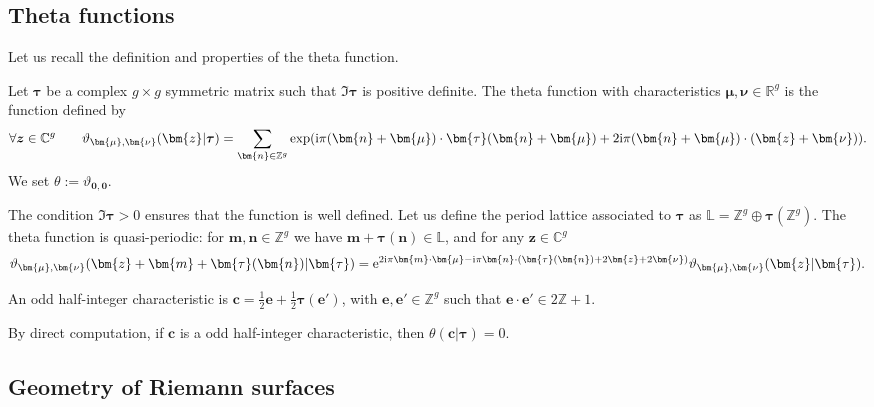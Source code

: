 \documentclass[10pt,a4paper]{amsart}
\numberwithin{equation}{section}
\newcommand{\ZZ}{\mathbb{Z}}
\newcommand{\CC}{\mathbb{C}}
\begin{document}
\subsection{Theta functions}
\label{sec:theta-function}

Let us recall the definition and properties of the theta function.
\begin{Definition}%
 Let $\bm{\tau}$ be a complex $g \times g$ symmetric matrix such that $\Im \boldsymbol{\tau}$ is positive definite. The
 theta function with characteristics
 $\boldsymbol{\mu},\boldsymbol{\nu} \in \mathbb{R}^{g}$ is the function defined by
\[
 \forall \boldsymbol{z} \in \mathbb{C}^{g} \qquad \vartheta_{\bm{\mu},\bm{\nu}}(\bm{z}|\boldsymbol{\tau}) = \sum_{\bm{n}\in\ZZ^{g}}\exp({\rm i}\pi(\bm{n}+\bm{\mu})\cdot \bm{\tau}(\bm{n}+\bm{\mu}) + 2{\rm i}\pi(\bm{n}+\bm{\mu})\cdot(\bm{z} + \bm{\nu})).
\]
We set $\theta := \vartheta_{\boldsymbol{0},\boldsymbol{0}}$.
\end{Definition}
The condition $\Im\bm{\tau} > 0$ ensures that the function is well
defined. Let us define the period lattice associated to $\bm{\tau}$ as $\mathbb{L} = \ZZ^{g} \oplus \bm{\tau}(\ZZ^{g})$. The theta function is quasi-periodic: for $\bm{m}, \bm{n}\in \ZZ^{g}$ we have
$\bm{m} + \bm{\tau}(\bm{n})\in\mathbb{L}$, and for any $\bm{z} \in \CC^{g}$
\begin{equation*}
 \vartheta_{\bm{\mu},\bm{\nu}} (\bm{z} + \bm{m} + \bm{\tau}(\bm{n}) |\bm{\tau} ) ={\rm e}^{2{\rm i}\pi \bm{m}\cdot \bm{\mu} - {\rm i}\pi\bm{n} \cdot (\bm{\tau}(\bm{n}) + 2\bm{z} + 2\bm{\nu})}\vartheta_{\bm{\mu},\bm{\nu}}(\bm{z}|\bm{\tau}).
\end{equation*}
\begin{Definition}
An odd half-integer characteristic is $\bm{c} = \frac{1}{2}\bm{e} + \frac{1}{2}\bm{\tau}(\bm{e}')$, with $\bm{e},\bm{e}' \in \ZZ^{g}$ such that $\bm{e} \cdot \bm{e}' \in 2\mathbb{Z} + 1$.
 \end{Definition}
 By direct computation, if $\bm{c}$ is a odd half-integer characteristic, then $\theta(\bm{c}|\bm{\tau}) = 0$.



\subsection{Geometry of Riemann surfaces}
\end{document}

